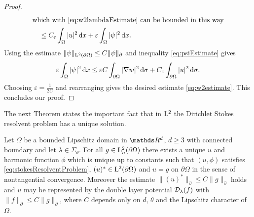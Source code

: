 \begin{proof}
\begin{align*}
    \intertext{which with \eqref{eq:w2lambdaEstimate} can be bounded in this way}
    &\quad \leq  C_\varepsilon \int_\Omega |u|^2 \, {\operatorname{d}\!{x}} + \varepsilon \int_\Omega |\psi|^2 \, {\operatorname{d}\!{x}}.
  \end{align*}
  Using the estimate $\|\psi\|_{\mathrm{L}^2(\partial\Omega)} \leq C \|\psi\|_\partial$ and inequality \eqref{eq:psiEstimate} gives
  \begin{align*}
    \varepsilon \int_\Omega |\psi|^2 \, {\operatorname{d}\!{x}} \leq \varepsilon C \int_{\partial\Omega} |\nabla w|^2 \, {\operatorname{d}\!{\sigma}} + C_\varepsilon \int_{\partial\Omega} |u|^2 \, {\operatorname{d}\!{\sigma}}.
  \end{align*}
  Choosing $\varepsilon = \frac{1}{2 C}$ and rearranging gives the desired estimate 
  \eqref{eq:w2estimate}.
  This concludes our proof.
\end{proof}

The next Theorem states the important fact that in $\mathrm{L}^2$ the Dirichlet Stokes resolvent problem has a unique solution.

\begin{thm}
  \label{thm:exAndUniqueSolution}
  Let $\Omega$ be a bounded Lipschitz domain in $\R^d$, $d \geq 3$ with connected boundary and let $\lambda \in \Sigma_\theta$.
  For all $g \in \mathrm{L}^2_n(\partial\Omega)$ there exists a unique $u$ and harmonic function $\phi$ which is unique up to constants such that $(u,\phi)$ satisfies \eqref{eq:stokesResolventProblem}, $(u)^* \in \mathrm{L}^2(\partial\Omega)$ and $u = g$ on $\partial\Omega$ in the sense of nontangential convergence.
  Moreover the estimate $ \| (u)^* \|_\partial \leq C \| g\|_\partial$ holds and $u$ may be represented by the double layer potential $\mathcal{D}_\lambda(f)$ with $\|f\|_\partial \leq C \|g\|_\partial$, where $C$ depends only on $d$, $\theta$ and the Lipschitz character of $\Omega$.
\end{thm}

